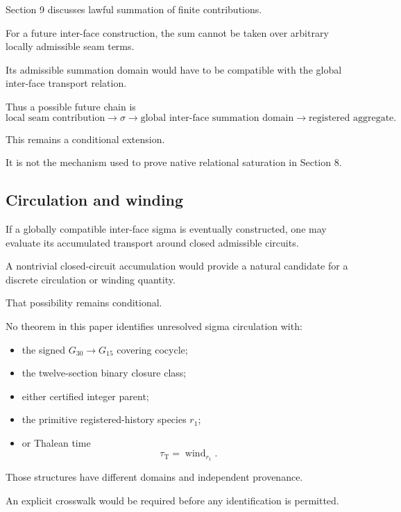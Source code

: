 Section 9 discusses lawful summation of finite contributions.

For a future inter-face construction, the sum cannot be taken over
arbitrary locally admissible seam terms.

Its admissible summation domain would have to be compatible with the
global inter-face transport relation.

Thus a possible future chain is
\[
\text{local seam contribution}
\longrightarrow
\sigma
\longrightarrow
\text{global inter-face summation domain}
\longrightarrow
\text{registered aggregate}.
\]

This remains a conditional extension.

It is not the mechanism used to prove native relational saturation in
Section 8.

\subsection{Circulation and winding}

If a globally compatible inter-face sigma is eventually constructed,
one may evaluate its accumulated transport around closed admissible
circuits.

A nontrivial closed-circuit accumulation would provide a natural
candidate for a discrete circulation or winding quantity.

That possibility remains conditional.

No theorem in this paper identifies unresolved sigma circulation with:

\begin{itemize}

\item the signed \(G_{30}\to G_{15}\) covering cocycle;

\item the twelve-section binary closure class;

\item either certified integer parent;

\item the primitive registered-history species \(r_1\);

\item or Thalean time
\[
\tau_{\mathrm T}=\operatorname{wind}_{r_1}.
\]

\end{itemize}

Those structures have different domains and independent provenance.

An explicit crosswalk would be required before any identification is
permitted.

